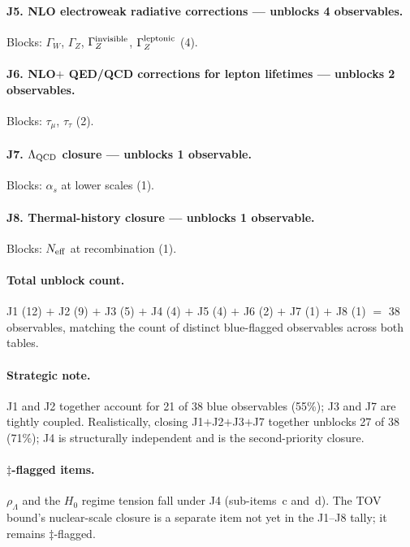 \documentclass[reprint,amsmath,amssymb,aps,prd,longbibliography,floatfix]{revtex4-2}
\begin{document}
\paragraph{J5. NLO electroweak radiative corrections ---
unblocks 4 observables.} Blocks: $\Gamma_W$, $\Gamma_Z$,
$\Gamma_Z^{\rm invisible}$, $\Gamma_Z^{\rm leptonic}$ (4).

\paragraph{J6. NLO$+$ QED/QCD corrections for lepton lifetimes
--- unblocks 2 observables.} Blocks: $\tau_\mu$, $\tau_\tau$ (2).

\paragraph{J7. $\Lambda_{\rm QCD}$ closure --- unblocks 1
observable.} Blocks: $\alpha_s$ at lower scales (1).

\paragraph{J8. Thermal-history closure --- unblocks 1 observable.}
Blocks: $N_{\rm eff}$ at recombination (1).

\paragraph{Total unblock count.}
J1 (12) $+$ J2 (9) $+$ J3 (5) $+$ J4 (4) $+$ J5 (4) $+$ J6 (2)
$+$ J7 (1) $+$ J8 (1) $=$ 38 observables, matching the count of
distinct blue-flagged observables across both tables.

\paragraph{Strategic note.}
J1 and J2 together account for 21 of 38 blue observables (55\%);
J3 and J7 are tightly coupled. Realistically, closing J1$+$J2$+$J3$+$J7
together unblocks 27 of 38 (71\%); J4 is structurally independent
and is the second-priority closure.

\paragraph{$\ddagger$-flagged items.} $\rho_\Lambda$ and the
$H_0$ regime tension fall under J4 (sub-items~c and~d). The TOV
bound's nuclear-scale closure is a separate item not yet in the
J1--J8 tally; it remains $\ddagger$-flagged.
\end{document}
